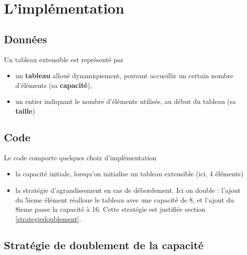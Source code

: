 



\clearpage
\section{L'implémentation}

\subsection{Données}

Un tableau extensible est représenté par

\begin{itemize}
\item un \textbf{tableau} alloué dynamiquement, pouvant accueillir
  un certain nombre d'éléments (sa \textbf{capacité}),
\item un entier indiquant le nombre d'éléments utilisés, au début
  du tableau (sa \textbf{taille})
\end{itemize}





\subsection{Code}

Le code comporte quelques choix d'implémentation

\begin{itemize}
\item la capacité initiale, lorsqu'on initialise un tableau extensible (ici, 4 éléments)
  \item la stratégie d'agrandissement en cas de débordement. Ici on
    double : l'ajout du 5ieme élément réalloue le tableau avec une
    capacité de 8, et l'ajout du 8ieme passe la capacité à 16.  Cette
    stratégie est justifiée section \ref{strategiedoublement}.
\end{itemize}



\subsection{Stratégie de doublement de la capacité}

